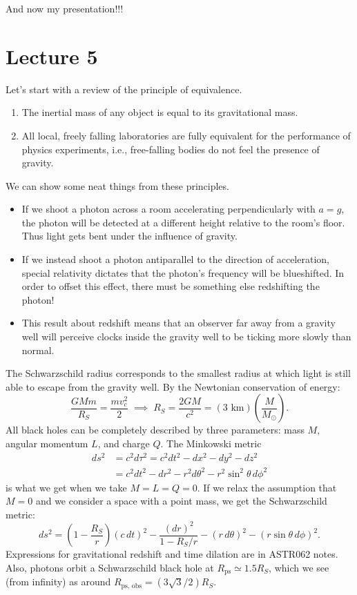 \documentclass[../a122main.tex]{subfiles}
\begin{document}
And now my presentation!!!

\section{Lecture 5}
Let's start with a review of the principle of equivalence.
\begin{enumerate}[topsep=0pt]
    \item The inertial mass of any object is equal to its gravitational mass.
    \item All local, freely falling laboratories are fully equivalent for the performance of physics experiments, i.e., free-falling bodies do not feel the presence of gravity.
\end{enumerate}
We can show some neat things from these principles.
\begin{itemize}[topsep=0pt]
    \item If we shoot a photon across a room accelerating perpendicularly with $a = g$, the photon will be detected at a different height relative to the room's floor.
    Thus light gets bent under the influence of gravity.

    \item If we instead shoot a photon antiparallel to the direction of acceleration, special relativity dictates that the photon's frequency will be blueshifted.
    In order to offset this effect, there must be something else redshifting the photon!

    \item This result about redshift means that an observer far away from a gravity well will perceive clocks inside the gravity well to be ticking more slowly than normal.
\end{itemize}
The Schwarzschild radius corresponds to the smallest radius at which light is still able to escape from the gravity well.
By the Newtonian conservation of energy:
\[ \frac{GMm}{R_S} = \frac{mv_c^2}{2} \;\implies\; R_S = \frac{2GM}{c^2} = (3 \textrm{ km}) \left( \frac{M}{M_\odot} \right). \]
All black holes can be completely described by three parameters: mass $M$, angular momentum $L$, and charge $Q$.
The Minkowski metric
\begin{align*}
    ds^2 &= c^2 d\tau^2 = c^2 dt^2 - dx^2 - dy^2 - dz^2 \\
    &= c^2 dt^2 - dr^2 - r^2 d\theta^2 - r^2 \sin^2 \theta \, d\phi^2
\end{align*}
is what we get when we take $M = L = Q = 0$.
If we relax the assumption that $M = 0$ and we consider a space with a point mass, we get the Schwarzschild metric:
\[ ds^2 = \left( 1 - \frac{R_S}{r} \right)(c\,dt)^2 - \frac{(dr)^2}{1 - R_S / r} - (r\,d\theta)^2 - (r\sin\theta\,d\phi)^2. \]
Expressions for gravitational redshift and time dilation are in ASTR062 notes.
Also, photons orbit a Schwarzschild black hole at $R_\textrm{ps} \simeq 1.5 R_S$, which we see (from infinity) as around $R_\textrm{ps, obs} = (3\sqrt{3} / 2) R_S$.
\end{document}
